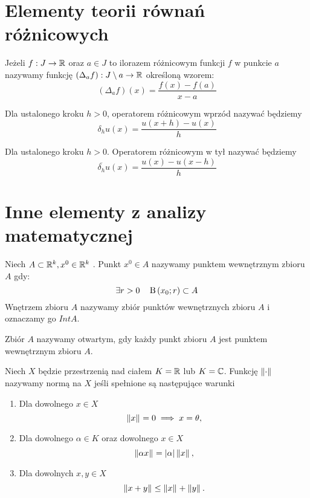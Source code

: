 \documentclass[12pt,a4paper]{report}
\begin{document}
\section{Elementy teorii równań różnicowych}
 
\begin{definition}
Jeżeli $ f: J \to \mathbb{R} $ oraz $ a \in J$ to ilorazem różnicowym funkcji $f$ w punkcie $a$ nazywamy funkcję $ (\Delta_{a}f) : J \setminus a \to \mathbb{R} $ określoną wzorem: 
$$
(\Delta_{a}f)(x) = \frac{f(x) - f(a)}{x-a}
$$
\end{definition}
\begin{definition}
Dla ustalonego kroku $h>0 $, operatorem różnicowym wprzód nazywać będziemy 
$$
\delta_h u(x) = \frac{u(x+h) - u(x)}{h}
$$
\end{definition}

\begin{definition}
Dla ustalonego kroku $h>0$. Operatorem różnicowym w tył nazywać będziemy 
$$
\overline{\delta_h} u(x) = \frac{u(x)-u(x-h)}{h} 
$$
\end{definition}


\section{Inne elementy z analizy matematycznej}

\begin{definition} 
Niech $A \subset \mathbb{R}^k, x^0 \in \mathbb{R}^k$ . Punkt $x^0 \in A$ nazywamy punktem wewnętrznym zbioru $A$ gdy:
$$
\exists  r>0 \quad   \ball{x_0}{r} \subset A
$$
Wnętrzem zbioru $A$ nazywamy zbiór punktów wewnętrznych zbioru $A$ i oznaczamy go $IntA$.
\end{definition}

\begin{definition}  
Zbiór $A$ nazywamy otwartym, gdy każdy punkt zbioru $A$ jest punktem wewnętrznym zbioru $A$. 
\end{definition}

\begin{definition} [Norma]
Niech $X$ będzie przestrzenią nad ciałem $K =\mathbb{R} $ lub $ K = \mathbb{C} $. Funkcję $\left\| {\cdot} \right\|_{}$ nazywamy normą na $X$ jeśli spełnione są następujące warunki 
\begin{enumerate}
\item Dla dowolnego $x\in X$
$$
 \left\| {x} \right\|_{} = 0 \implies x = \theta,
$$
\item Dla dowolnego $\alpha \in K$ oraz dowolnego $x \in X$ 
$$
\left\| {\alpha x} \right\|_{}  = {\left| {\alpha} \right|}  \left\| {x} \right\|_{},
$$
\item Dla dowolnych $x,y\in X$
$$
 \left\| {x+y} \right\|_{} \leq \left\| {x} \right\|_{} + \left\| {y} \right\|_{}.
$$
\end{enumerate}

\end{definition}
\end{document}
